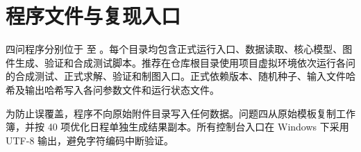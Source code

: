 \section{程序文件与复现入口}

四问程序分别位于  至 。每个目录均包含正式运行入口、数据读取、核心模型、图件生成、验证和合成测试脚本。推荐在仓库根目录使用项目虚拟环境依次运行各问的合成测试、正式求解、验证和制图入口。正式依赖版本、随机种子、输入文件哈希及输出哈希写入各问参数文件和运行状态文件。

为防止误覆盖，程序不向原始附件目录写入任何数据。问题四从原始模板复制工作簿，并按 40 项优化日程单独生成结果副本。所有控制台入口在 Windows 下采用 UTF-8 输出，避免字符编码中断验证。
